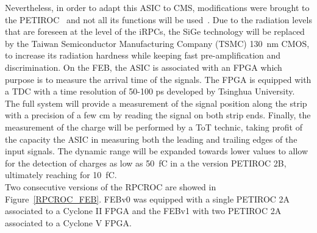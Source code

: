 	Nevertheless, in order to adapt this ASIC to CMS, modifications were brought to the PETIROC~\cite{PHASEIITP} and not all its functions will be used~\cite{COMBARET2018}. Due to the radiation levels that are foreseen at the level of the iRPCs, the SiGe technology will be replaced by the Taiwan Semiconductor Manufacturing Company (TSMC) \SI{130}{nm} CMOS, to increase its radiation hardness while keeping fast pre-amplification and discrimination. On the \acl{FEB}, the ASIC is associated with an FPGA which purpose is to measure the arrival time of the signals. The FPGA is equipped with a TDC with a time resolution of 50-100 \si{ps} developed by Tsinghua University. The full system will provide a measurement of the signal position along the strip with a precision of a few \si{cm} by reading the signal on both strip ends. Finally, the measurement of the charge will be performed by a \acf{ToT} technic, taking profit of the capacity the ASIC in measuring both the leading and trailing edges of the input signals. The dynamic range will be expanded towards lower values to allow for the detection of charges as low as \SI{50}{fC} in a the version PETIROC 2B, ultimately reaching for \SI{10}{fC}.\\
	Two consecutive versions of the RPCROC are showed in Figure~\ref{RPCROC_FEB}. FEBv0 was equipped with a single PETIROC 2A associated to a Cyclone II FPGA and the FEBv1 with two PETIROC 2A associated to a Cyclone V FPGA.

